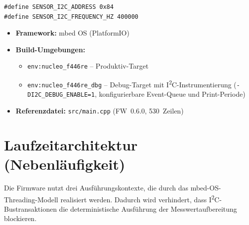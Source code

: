 \begin{lstlisting}[style=firmwarestyle, caption={I\textsuperscript{2}C-Adresskonfiguration (\texttt{main.cpp}, Z.~36--37).}, label={lst:sensor_addr}]
#define SENSOR_I2C_ADDRESS 0x84
#define SENSOR_I2C_FREQUENCY_HZ 400000
\end{lstlisting}


\begin{itemize}
  \item \textbf{Framework:} mbed OS (PlatformIO)
  \item \textbf{Build-Umgebungen:}
    \begin{itemize}
      \item \texttt{env:nucleo\_f446re} -- Produktiv-Target
      \item \texttt{env:nucleo\_f446re\_dbg} -- Debug-Target mit I\textsuperscript{2}C-Instrumentierung (\texttt{-DI2C\_DEBUG\_ENABLE=1}, konfigurierbare Event-Queue und Print-Periode)
    \end{itemize}
  \item \textbf{Referenzdatei:} \texttt{src/main.cpp} (FW~0.6.0, \num{530}~Zeilen)
\end{itemize}

\section{Laufzeitarchitektur (Nebenläufigkeit)}
\label{sec:sensor_threading}

Die Firmware nutzt drei Ausführungskontexte, die durch das mbed-OS-Threading-Modell realisiert werden.
Dadurch wird verhindert, dass I\textsuperscript{2}C-Bustransaktionen die deterministische Ausführung der Messwertaufbereitung blockieren.

